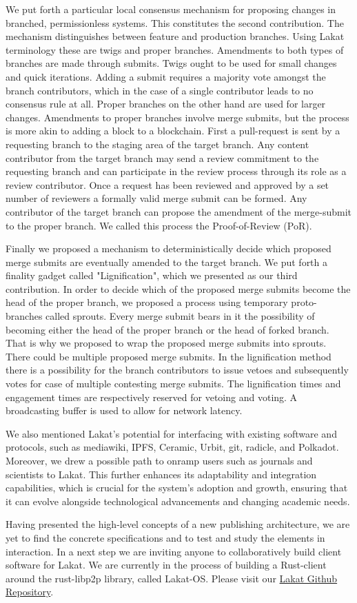 We put forth a particular local consensus mechanism for proposing changes in branched, permissionless systems. This constitutes the second contribution. The mechanism distinguishes between feature and production branches. Using Lakat terminology these are twigs and proper branches. Amendments to both types of branches are made through submits. Twigs ought to be used for small changes and quick iterations. Adding a submit requires a majority vote amongst the branch contributors, which in the case of a single contributor leads to no consensus rule at all. Proper branches on the other hand are used for larger changes. Amendments to proper branches involve merge submits, but the process is more akin to adding a block to a blockchain. First a pull-request is sent by a requesting branch to the staging area of the target branch. Any content contributor from the target branch may send a review commitment to the requesting branch and can participate in the review process through its role as a review contributor. Once a request has been reviewed and approved by a set number of reviewers a formally valid merge submit can be formed. Any contributor of the target branch can propose the amendment of the merge-submit to the proper branch. We called this process the Proof-of-Review (PoR).

Finally we proposed a mechanism to deterministically decide which proposed merge submits are eventually amended to the target branch. We put forth a finality gadget called "Lignification", which we presented as our third contribution. In order to decide which of the proposed merge submits become the head of the proper branch, we proposed a process using temporary proto-branches called sprouts. Every merge submit bears in it the possibility of becoming either the head of the proper branch or the head of forked branch. That is why we proposed to wrap the proposed merge submits into sprouts. There could be multiple proposed merge submits. In the lignification method there is a possibility for the branch contributors to issue vetoes and subsequently votes for case of multiple contesting merge submits. The lignification times and engagement times are respectively reserved for vetoing and voting. A broadcasting buffer is used to allow for network latency. 

We also mentioned Lakat's potential for interfacing with existing software and protocols, such as mediawiki, IPFS, Ceramic, Urbit, git, radicle, and Polkadot. Moreover, we drew a possible path to onramp users such as journals and scientists to Lakat. This further enhances its adaptability and integration capabilities, which is crucial for the system's adoption and growth, ensuring that it can evolve alongside technological advancements and changing academic needs.

Having presented the high-level concepts of a new publishing architecture, we are yet to find the concrete specifications and to test and study the elements in interaction. In a next step we are inviting anyone to collaboratively build client software for Lakat. We are currently in the process of building a Rust-client around the rust-libp2p library, called Lakat-OS. Please visit our \href{https://github.com/Lakat-OS}{Lakat Github Repository}.
